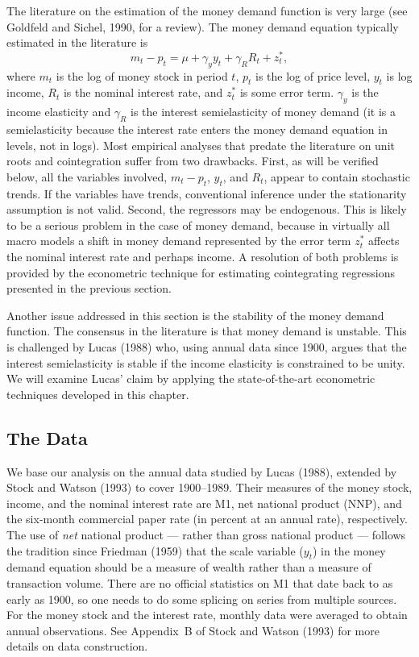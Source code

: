 
The literature on the estimation of the money demand function is very large (see
Goldfeld and Sichel, 1990, for a review). The money demand equation typically
estimated in the literature is
\begin{equation}
  m_t - p_t = \mu + \gamma_y y_t + \gamma_R R_t + z_t^*,
  \label{eq:10.5.1} \tag{10.5.1}
\end{equation}
where $m_t$ is the log of money stock in period $t$, $p_t$ is the log of price level, $y_t$ is
log income, $R_t$ is the nominal interest rate, and $z_t^*$ is some error term. $\gamma_y$ is the
income elasticity and $\gamma_R$ is the interest semielasticity of money demand (it is a
semielasticity because the interest rate enters the money demand equation in lev\-els,
not in logs). Most empirical analyses that predate the literature on unit roots
and cointegration suffer from two drawbacks. First, as will be verified below, all
the variables involved, $m_t - p_t$, $y_t$, and $R_t$, appear to contain stochastic trends. If
the variables have trends, conventional inference under the stationarity assumption
is not valid. Second, the regressors may be endogenous. This is likely to be a seri\-ous
problem in the case of money demand, because in virtually all macro models a
shift in money demand represented by the error term $z_t^*$ affects the nominal interest
rate and perhaps income. A resolution of both problems is provided by the econo\-metric
technique for estimating cointegrating regressions presented in the previous
section.

Another issue addressed in this section is the stability of the money demand
function. The consensus in the literature is that money demand is unstable. This
is challenged by Lucas (1988) who, using annual data since 1900, argues that the
interest semielasticity is stable if the income elasticity is constrained to be unity.
We will examine Lucas' claim by applying the state-of-the-art econometric tech\-niques
developed in this chapter.

\subsection*{The Data}

We base our analysis on the annual data studied by Lucas (1988), extended by
Stock and Watson (1993) to cover 1900--1989. Their measures of the money stock,
income, and the nominal interest rate are M1, net national product (NNP), and
the six-month commercial paper rate (in percent at an annual rate), respectively.
The use of \emph{net} national product --- rather than gross national product --- follows the
tradition since Friedman (1959) that the scale variable ($y_t$) in the money demand
equation should be a measure of wealth rather than a measure of transaction vol\-ume.
There are no official statistics on M1 that date back to as early as 1900, so one
needs to do some splicing on series from multiple sources. For the money stock
and the interest rate, monthly data were averaged to obtain annual observations.
See Appendix~B of Stock and Watson (1993) for more details on data construction.


